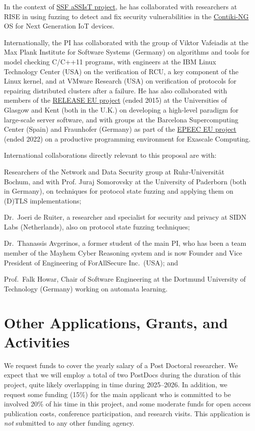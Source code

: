 \documentclass[11pt]{article}
\begin{document}
In the context of \href{https://assist-project.github.io}{SSF aSSIsT project},
he has collaborated with researchers at RISE in using fuzzing to detect and
fix security vulnerabilities in the
\href{https://www.contiki-ng.org/}{Contiki-NG} OS for Next Generation IoT
devices.

Internationally, the PI has collaborated with the group of Viktor Vafeiadis at
the Max Plank Institute for Software Systems (Germany) on algorithms and tools
for model checking C/C++11 programs, with
engineers at the IBM Linux Technology Center (USA) on the verification of
RCU, a key component of the Linux kernel, and
at VMware Research (USA) on verification of protocols for repairing
distributed clusters after a failure.
%
He has also collaborated with members of the
\href{http://release-project.eu/}{RELEASE EU project} (ended 2015) at the
Universities of Glasgow and Kent (both in the U.K.) on developing a high-level
paradigm for large-scale server software, and with groups at the Barcelona
Supercomputing Center (Spain) and Fraunhofer (Germany) as part of the
\href{https://epeec-project.eu/}{EPEEC EU project} (ended 2022) on a
productive programming environment for Exascale Computing.

International collaborations directly relevant to this proposal are with:
\begin{inparaenum}[(1)]
\item Researchers of the Network and Data Security group at Ruhr-Universit\"at
  Bochum, and with Prof. Juraj Somorovsky at the University of Paderborn (both
  in Germany), on techniques for protocol state fuzzing and applying them on
  (D)TLS implementations;
\item Dr.~Joeri de Ruiter, a researcher and specialist for security and
  privacy at SIDN Labs (Netherlands), also on protocol state fuzzing
  techniques;
\item Dr.~Thanassis Avgerinos, a former student of the main PI, who has been a
  team member of the Mayhem Cyber Reasoning system and is now Founder and Vice
  President of Engineering of ForAllSecure Inc.\ (USA); and
\item Prof.~Falk Howar, Chair of Software Engineering at the Dortmund
  University of Technology (Germany) working on automata learning.
\end{inparaenum}

\section{Other Applications, Grants, and Activities}
We request funds to cover the yearly salary of a Post Doctoral researcher.
We expect that we will employ a total of two PostDocs during the duration of
this project, quite likely overlapping in time during 2025--2026.
%
In addition, we request some funding (15\%) for the main applicant who is
committed to be involved 20\% of his time in this project, and some moderate
funds for open access publication costs, conference participation, and
research visits.
%
This application is \emph{not} submitted to any other funding agency.
\end{document}

